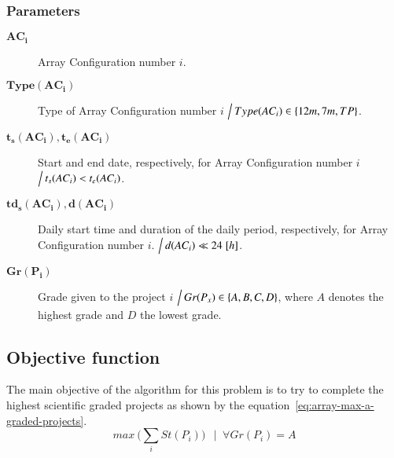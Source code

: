 \subsubsection{Parameters}
\begin{description}
\item[$\mathbf{AC_i}$] Array Configuration number $i$.

\item[$\mathbf{Type(AC_i)}$] Type of Array Configuration number $i$ $\Big\slash\: Type(AC_i) \in \{12m, 7m, TP\}$.

\item[$\mathbf{t_s(AC_i), t_e(AC_i)}$] Start and end date, respectively, for Array Configuration number $i$ $\Big\slash\: t_s(AC_i) < t_e(AC_i)$.

\item[$\mathbf{td_s(AC_i), d(AC_i)}$] Daily start time and duration of the daily period, respectively, for Array Configuration number $i$. $\Big\slash\: d(AC_i) \ll 24\;[h]$.

\item[$\mathbf{Gr(P_i)}$] Grade given to the project $i$ $\Big\slash\: Gr(P_x) \in \{A,B,C,D\}$, where $A$ denotes the highest grade and $D$ the lowest grade.
\end{description}

\subsection{Objective function}
The main objective of the algorithm for this problem is to try to complete the highest scientific graded projects as shown by the equation~\ref{eq:array-max-a-graded-projects}.
\begin{equation}
\label{eq:array-max-a-graded-projects}
max \: \bigg(\sum_{i} St(P_i)\bigg) \:\: \mid\; \forall Gr(P_i) = A
\end{equation}

